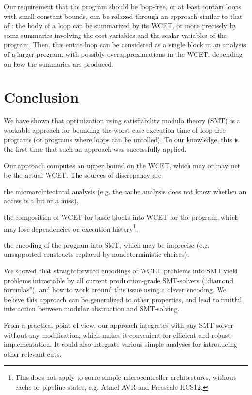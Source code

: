 \documentclass[a4paper,twocolumn,11pt]{article}
\newcommand{\RegTM}{\texttrademark}
\begin{document}
Our requirement that the program should be loop-free, or at least contain loops with small constant bounds, can be relaxed through an approach similar to that of \textcite{Chu_Jaffar_EMSOFT2011}: the body of a loop can be summarized by its WCET, or more precisely by some summaries involving the cost variables and the scalar variables of the program. Then, this entire loop can be considered as a single block in an analysis of a larger program, with possibly overapproximations in the WCET, depending on how the summaries are produced.

\section{Conclusion}
\label{sec:conclusion}
We have shown that optimization using satisfiability modulo theory (SMT) is a workable approach for bounding the worst-case execution time of loop-free programs (or programs where loops can be unrolled). To our knowledge, this is the first time that such an approach was successfully applied.

Our approach computes an upper bound on the WCET, which may or may not be the actual WCET.
The sources of discrepancy are
\begin{enumerate*}[label={\arabic*)}]
\item the microarchitectural analysis (e.g. the cache analysis does not know whether an access is a hit or a miss),
\item the composition of WCET for basic blocks into WCET for the program, which may lose dependencies on execution history\footnote{This does not apply to some simple microcontroller architectures, without cache or pipeline states, e.g. Atmel AVR{\RegTM} and Freescale{\texttrademark} HCS12.},
\item the encoding of the program into SMT, which may be imprecise (e.g. unsupported constructs replaced by nondeterministic choices).
\end{enumerate*}

We showed that straightforward encodings of WCET problems into SMT yield problems intractable by all current production-grade SMT-solvers (``diamond formulas''), and how to work around this issue using a clever encoding.
We believe this approach can be generalized to other properties, and lead to fruitful interaction between modular abstraction and SMT-solving.

From a practical point of view, our approach integrates with any SMT solver without any modification, which makes it convenient for efficient and robust implementation. It could also integrate various simple analyses for introducing other relevant cuts.
\end{document}
